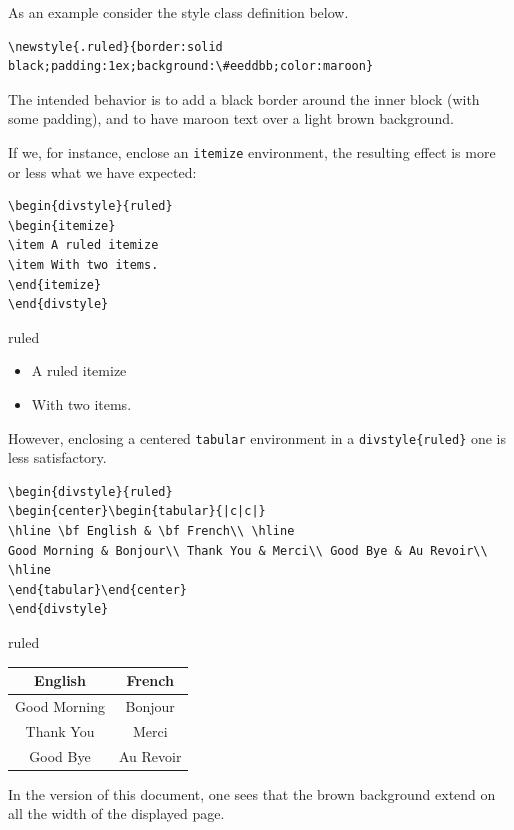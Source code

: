 As an example consider the style class definition below.
\begin{verbatim}
\newstyle{.ruled}{border:solid black;padding:1ex;background:\#eeddbb;color:maroon}
\end{verbatim}
The intended behavior is to add a black border around the inner block
(with some padding), and to have {\ifhevea\maroon maroon\else\fi} text over
a light brown background.

If we, for instance, enclose an \texttt{itemize} environment, the
resulting effect is more or less what we have expected:
\begin{verbatim}
\begin{divstyle}{ruled}
\begin{itemize}
\item A ruled itemize
\item With two items.
\end{itemize}
\end{divstyle}
\end{verbatim}
\begin{htmlonly}
\begin{divstyle}{ruled}
\begin{itemize}
\item A ruled itemize
\item With two items.
\end{itemize}
\end{divstyle}
\end{htmlonly}

However, enclosing a centered
\texttt{tabular} environment in a \texttt{divstyle\{ruled\}} one 
is less satisfactory.
\begin{verbatim}
\begin{divstyle}{ruled}
\begin{center}\begin{tabular}{|c|c|}
\hline \bf English & \bf French\\ \hline
Good Morning & Bonjour\\ Thank You & Merci\\ Good Bye & Au Revoir\\ \hline
\end{tabular}\end{center}
\end{divstyle}
\end{verbatim}
\begin{htmlonly}
\begin{divstyle}{ruled}
\begin{center}\begin{tabular}{|c|c|}
\hline \bf English & \bf French\\ \hline
Good Morning & Bonjour\\ Thank You & Merci\\ Good Bye & Au Revoir\\
\hline
\end{tabular}\end{center}
\end{divstyle}
\end{htmlonly}
In the \html{} version of this document,
one sees that the brown background extend on all the width
of the displayed page.


